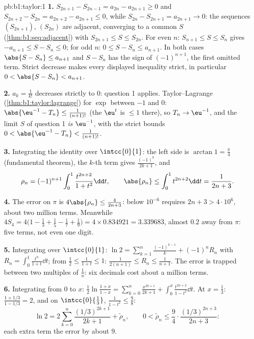 \begin{solution}{pb:b1:taylor:1}
\textbf{1.} $S_{2n+1} - S_{2n-1} = a_{2n} - a_{2n+1} \geq 0$ and
$S_{2n+2} - S_{2n} = a_{2n+2} - a_{2n+1} \leq 0$, while $S_{2n}
- S_{2n+1} = a_{2n+1} \to 0$: the sequences $(S_{2n+1})$,
$(S_{2n})$ are adjacent, converging to a common $S$
(\cref{thm:b1:seq:adjacent}) with $S_{2n+1} \leq S \leq S_{2n}$.
For even $n$: $S_{n+1} \leq S \leq S_n$ gives $-a_{n+1} \leq S -
S_n \leq 0$; for odd $n$: $0 \leq S - S_n \leq a_{n+1}$. In both
cases $\abs{S - S_n} \leq a_{n+1}$ and $S - S_n$ has the sign of
$(-1)^{n+1}$, the first omitted term. Strict decrease makes
every displayed inequality strict, in particular $0 < \abs{S -
S_n} < a_{n+1}$.

\textbf{2.} $a_k = \frac{1}{k!}$ decreases strictly to $0$:
question 1 applies. Taylor--Lagrange
(\cref{thm:b1:taylor:lagrange}) for $\exp$ between $-1$ and $0$:
$\abs{\eu^{-1} - T_n} \leq \frac{1}{(n+1)!}$ (the 
$\eu^t$ is $\leq 1$ there), so $T_n \to \eu^{-1}$, and the limit
$S$ of question 1 \emph{is} $\eu^{-1}$, with the strict bounds
$0 < \abs{\eu^{-1} - T_n} < \frac{1}{(n+1)!}$.

\textbf{3.} Integrating the identity over $\intcc{0}{1}$: the
left side is $\arctan 1 = \frac\pi4$ (fundamental theorem), the
$k$-th term gives $\frac{(-1)^k}{2k+1}$, and
\[
\rho_n = (-1)^{n+1}\int_0^1 \frac{t^{2n+2}}{1+t^2}\dd t,
\qquad
\abs{\rho_n} \leq \int_0^1 t^{2n+2}\dd t = \frac{1}{2n+3} .
\]

\textbf{4.} The error on $\pi$ is $4\abs{\rho_n} \leq
\frac{4}{2n+3}$: below $10^{-6}$ requires $2n + 3 > 4\cdot10^6$,
about two million terms. Meanwhile $4S_4 = 4\bigl(1 - \frac13 +
\frac15 - \frac17 + \frac19\bigr) = 4 \times 0.834921 =
3.339683$, almost $0.2$ away from $\pi$: five terms, not even
one digit.

\textbf{5.} Integrating over $\intcc{0}{1}$: $\ln 2 =
\sum_{k=1}^{n} \frac{(-1)^{k-1}}{k} + (-1)^n R_n$ with $R_n =
\int_0^1 \frac{t^n}{1+t}\dd t$; from $\frac12 \leq \frac{1}{1+t}
\leq 1$: $\frac{1}{2(n+1)} \leq R_n \leq \frac{1}{n+1}$. The
error is trapped between two multiples of $\frac1n$: six
decimals cost about a million terms.

\textbf{6.} Integrating from $0$ to $x$: $\frac12\ln\frac{1 +
x}{1 - x} = \sum_{k=0}^{n} \frac{x^{2k+1}}{2k+1} + \int_0^x
\frac{t^{2n+2}}{1-t^2}\dd t$. At $x = \frac13$: $\frac{1 +
1/3}{1 - 1/3} = 2$, and on $\intcc{0}{\frac13}$, $\frac{1}{1 -
t^2} \leq \frac98$:
\[
\ln 2 = 2\sum_{k=0}^{n} \frac{(1/3)^{2k+1}}{2k+1} +
\tilde\rho_n,
\qquad
0 < \tilde\rho_n \leq \frac{9}{4}\cdot
\frac{(1/3)^{2n+3}}{2n+3} :
\]
each extra term  the error by about $9$.


\end{solution}
